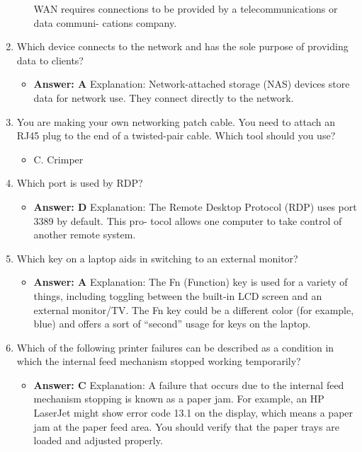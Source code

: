 \documentclass{article}
\begin{document}
\begin{enumerate}
\begin{itemize}
WAN requires connections to be provided by a telecommunications or data communi-
cations company.
    \end{itemize}
    \item Which device connects to the network and has the sole purpose of
providing data to clients?
    \begin{itemize}
        \item \textbf{Answer: A}
Explanation: Network-attached storage (NAS) devices store data for network use. They
connect directly to the network.
    \end{itemize}
    \item You are making your own networking patch cable. You need to
attach an RJ45 plug to the end of a twisted-pair cable. Which tool
should you use?
    \begin{itemize}
        \item C. Crimper
    \end{itemize}
    \item Which port is used by RDP?
    \begin{itemize}
        \item \textbf{Answer: D}
Explanation: The Remote Desktop Protocol (RDP) uses port 3389 by default. This pro-
tocol allows one computer to take control of another remote system.
    \end{itemize}
    \item Which key on a laptop aids in switching to an external monitor?
    \begin{itemize}
        \item \textbf{Answer: A}
Explanation: The Fn (Function) key is used for a variety of things, including toggling
between the built-in LCD screen and an external monitor/TV. The Fn key could be a
different color (for example, blue) and offers a sort of “second” usage for keys on the
laptop.
    \end{itemize}
    \item Which of the following printer failures can be described as a
condition in which the internal feed mechanism stopped working
temporarily?
    \begin{itemize}
        \item \textbf{Answer: C}
Explanation: A failure that occurs due to the internal feed mechanism stopping is
known as a paper jam. For example, an HP LaserJet might show error code 13.1 on
the display, which means a paper jam at the paper feed area. You should verify that the
paper trays are loaded and adjusted properly.
    \end{itemize}

\end{enumerate}
\end{document}
